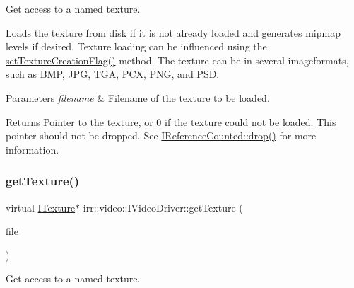 Get access to a named texture. 

Loads the texture from disk if it is not already loaded and generates mipmap levels if desired. Texture loading can be influenced using the \hyperlink{classirr_1_1video_1_1IVideoDriver_a868b58a6b86b9e4841ca3879ce246c4e}{set\+Texture\+Creation\+Flag()} method. The texture can be in several imageformats, such as B\+MP, J\+PG, T\+GA, P\+CX, P\+NG, and P\+SD. 
\begin{DoxyParams}{Parameters}
{\em filename} & Filename of the texture to be loaded. \\
\hline
\end{DoxyParams}
\begin{DoxyReturn}{Returns}
Pointer to the texture, or 0 if the texture could not be loaded. This pointer should not be dropped. See \hyperlink{classirr_1_1IReferenceCounted_a03856a09355b89d178090c4a5f738543}{I\+Reference\+Counted\+::drop()} for more information. 
\end{DoxyReturn}
\mbox{\label{classirr_1_1video_1_1IVideoDriver_aaf989c8688ffe2a28a4b8e7b6ec2bce7}} 
\subsubsection{\texorpdfstring{get\+Texture()}{getTexture()}\hspace{0.1cm}{\footnotesize\ttfamily [3/4]}}
{\footnotesize\ttfamily virtual \hyperlink{classirr_1_1video_1_1ITexture}{I\+Texture}$\ast$ irr\+::video\+::\+I\+Video\+Driver\+::get\+Texture (\begin{DoxyParamCaption}\item[{\hyperlink{classirr_1_1io_1_1IReadFile}{io\+::\+I\+Read\+File} $\ast$}]{file }\end{DoxyParamCaption})\hspace{0.3cm}{\ttfamily [pure virtual]}}



Get access to a named texture. 

